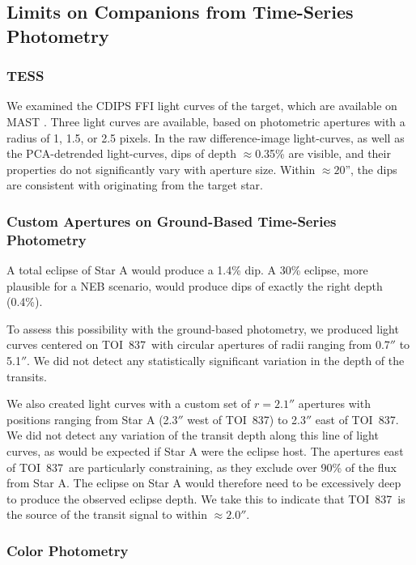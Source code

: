 \documentclass[12pt,twocolumn,tighten]{aastex62}
\newcommand{\tn}{TOI~837} %
\begin{document}
\subsection{Limits on Companions from Time-Series Photometry}

\subsubsection{TESS}
We examined the CDIPS FFI light curves of the target, which are
available on MAST \citep{bouma_cluster_2019}. Three light curves are
available, based on photometric apertures with a radius of 1, 1.5, or
2.5 pixels.  In the raw difference-image light-curves, as well as the
PCA-detrended light-curves, dips of depth $\approx$0.35\% are visible,
and their properties do not significantly vary with aperture size.
Within $\approx20$'', the dips are consistent with originating from
the target star.

\subsubsection{Custom Apertures on Ground-Based Time-Series Photometry}

A total eclipse of Star A would produce a 1.4\%
dip. A 30\% eclipse, more plausible for a NEB scenario, would produce
dips of exactly the right depth (0.4\%).

To assess this possibility with the ground-based photometry, we
produced light curves centered on \tn\ with
circular apertures of radii ranging from 0.7$''$ to 5.1$''$.
We did not detect any statistically significant variation in the depth
of the transits.

We also created light curves with a custom set of $r=2.1''$ apertures
with positions ranging from Star A (2.3$''$ west of \tn) to 2.3$''$
east of \tn.  We did not detect any variation of the transit depth
along this line of light curves, as would be expected if Star A were
the eclipse host.  The apertures east of \tn\ are particularly
constraining, as they exclude over 90\% of the flux from Star A.
The eclipse on Star A would therefore need to be excessively deep to
produce the observed eclipse depth.
We take this to indicate that \tn\ is the source of the transit signal
to within $\approx2.0''$.

\newpage
\subsubsection{Color Photometry}
\end{document}
